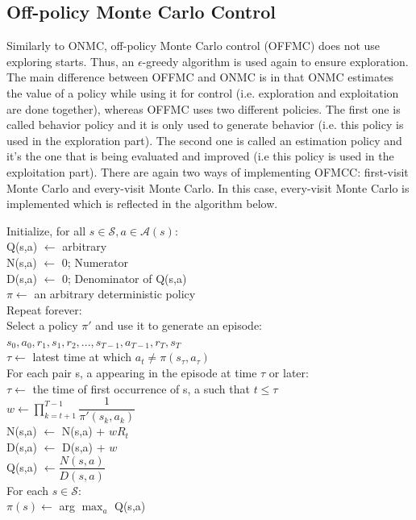 \documentclass{article}
\newcommand{\tab}{\hspace{10mm}}
\newcommand{\dtab}{\hspace{20mm}}
\begin{document}
\subsection{Off-policy Monte Carlo Control}
Similarly to ONMC, off-policy Monte Carlo control (OFFMC) does not use exploring starts. Thus, an $\epsilon$-greedy algorithm is used again to ensure exploration. The main difference between OFFMC and ONMC is in that ONMC estimates the value of a policy while using it for control (i.e. exploration and exploitation are done together), whereas OFFMC uses two different policies. The first one is called behavior policy and it is only used to generate behavior (i.e. this policy is used in the exploration part). The second one is called an estimation policy and it's the one that is being evaluated and improved (i.e this policy is used in the exploitation part). There are again two ways of implementing OFMCC: first-visit Monte Carlo and every-visit Monte Carlo. In this case, every-visit Monte Carlo is implemented which is reflected in the algorithm below. 

 
\begin{center}
\begin{mdframed}
\begin{algorithm}[H]
Initialize, for all $s \in \mathcal{S}, a \in \mathcal{A}(s)$:\\
\tab Q(s,a) $\leftarrow$ arbitrary\\
\tab N(s,a) $\leftarrow$ 0; Numerator\\
\tab D(s,a) $\leftarrow$ 0; Denominator of Q(s,a)\\
\tab $\pi \leftarrow$ an arbitrary deterministic policy\\

Repeat forever:\\
\tab Select a policy $\pi '$ and use it to generate an episode:\\
\dtab $s_0, a_0, r_1, s_1, r_2, ..., s_{T-1}, a_{T-1}, r_T, s_T$ \\
\tab $\tau \leftarrow$ latest time at which $a_t \neq \pi (s_{\tau}, a_{\tau})$\\
\tab For each pair s, a appearing in the episode at time $\tau$ or later:\\
\dtab $\tau \leftarrow$ the time of first occurrence of s, a such that $t \leq \tau$\\
\dtab $w \leftarrow \prod\limits_{k=t+1}^{T-1} \dfrac{1}{\pi'(s_k, a_k)}$\\
\dtab N(s,a) $\leftarrow$ N(s,a) + $wR_t$\\
\dtab D(s,a) $\leftarrow$ D(s,a) + $w$ \\
\dtab Q(s,a) $\leftarrow \dfrac{N(s,a)}{D(s,a)}$ \\
\tab For each $s \in \mathcal{S}$: \\
\dtab $\pi(s) \leftarrow$ arg $\max_a$ Q(s,a)\\
\end{algorithm}
\end{mdframed}
\label{alg:OFFMC}
\end{center}
\end{document}

